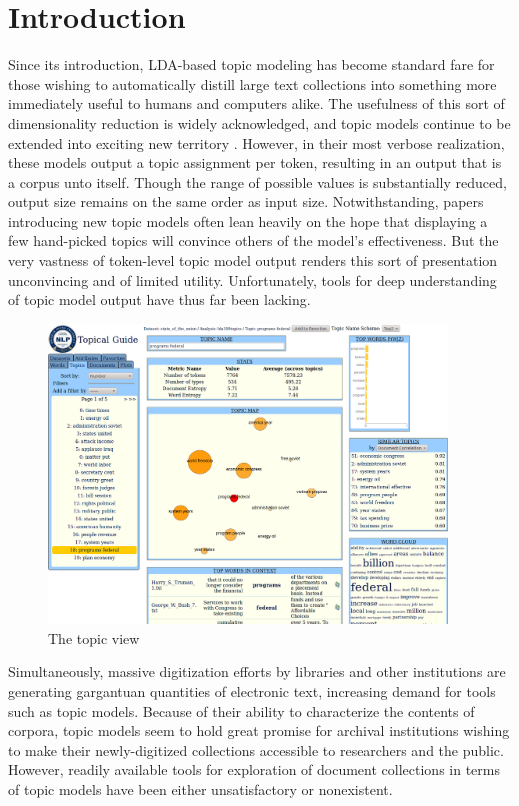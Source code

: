 \documentclass[11pt]{article}
\begin{document}
\section{Introduction}
Since its introduction, LDA-based topic modeling \cite{blei_latent_2003} has
become standard fare for those wishing to automatically distill large text
collections into something more immediately useful to humans and computers
alike. The usefulness of this sort of dimensionality reduction is widely
acknowledged, and topic models continue to be extended into exciting new
territory
\cite{wang_continuous_2008,mimno_polylingual_2009,boyd-graber_holistic_2010,brody_unsupervised_2010,he_detecting_2009,yao_efficient_2009}.
However, in their most verbose realization, these models output a topic
assignment per token, resulting in an output that is a corpus unto itself.
Though the range of possible values is substantially reduced, output size
remains on the same order as input size. Notwithstanding, papers introducing new
topic models often lean heavily on the hope that displaying a few hand-picked
topics will convince others of the model's effectiveness. But the very vastness
of token-level topic model output renders this sort of presentation unconvincing
and of limited utility. Unfortunately, tools for deep understanding of topic model output have thus far
been lacking.
\begin{figure}[t]
 \centering
 \includegraphics[width=400px,keepaspectratio=true]{./topic_page_take4.png}
 \caption{The topic view}
 \label{fig:topic_page}
\end{figure}

Simultaneously, massive digitization efforts by libraries and other institutions
are generating gargantuan quantities of electronic text, increasing demand for tools such as
topic models. Because of their ability to characterize the contents of
corpora, topic models seem to hold great promise for archival
institutions wishing to make their newly-digitized collections accessible to
researchers and the public. However, readily available tools for exploration of 
document collections in terms of topic models have been either unsatisfactory
or nonexistent.
\end{document}
